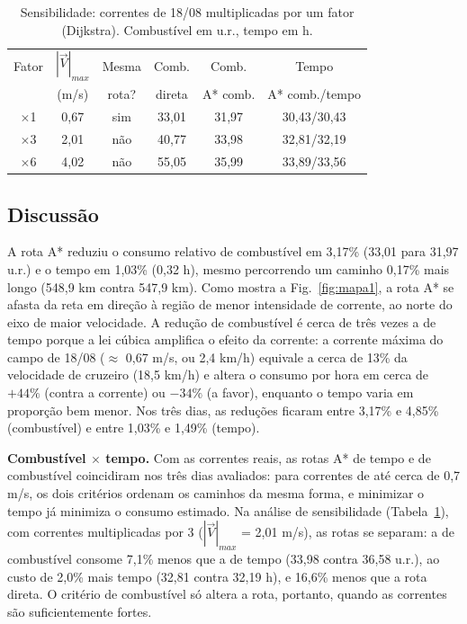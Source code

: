 \documentclass[conference]{IEEEtran}
\begin{document}
\begin{table}[t]
\caption{Sensibilidade: correntes de 18/08 multiplicadas por um fator (Dijkstra). Combustível em u.r., tempo em h.}
\label{tab:sens}
\centering
\footnotesize
\begin{tabular}{@{}cccccc@{}}
\toprule
Fator & $|\vec{V}|_{max}$ & Mesma & Comb. & Comb. & Tempo\\
 & (m/s) & rota? & direta & A* comb. & A* comb./tempo\\
\midrule
$\times$1 & 0,67 & sim & 33,01 & 31,97 & 30,43/30,43\\
$\times$3 & 2,01 & não & 40,77 & 33,98 & 32,81/32,19\\
$\times$6 & 4,02 & não & 55,05 & 35,99 & 33,89/33,56\\
\bottomrule
\end{tabular}
\end{table}

\subsection{Discussão}
A rota A* reduziu o consumo relativo de combustível em 3,17\% (33,01 para 31,97 u.r.) e o tempo em 1,03\% (0,32 h), mesmo percorrendo um caminho 0,17\% mais longo (548,9 km contra 547,9 km). Como mostra a Fig.~\ref{fig:mapa1}, a rota A* se afasta da reta em direção à região de menor intensidade de corrente, ao norte do eixo de maior velocidade. A redução de combustível é cerca de três vezes a de tempo porque a lei cúbica amplifica o efeito da corrente: a corrente máxima do campo de 18/08 ($\approx$ 0,67 m/s, ou 2,4 km/h) equivale a cerca de 13\% da velocidade de cruzeiro (18,5 km/h) e altera o consumo por hora em cerca de $+44\%$ (contra a corrente) ou $-34\%$ (a favor), enquanto o tempo varia em proporção bem menor. Nos três dias, as reduções ficaram entre 3,17\% e 4,85\% (combustível) e entre 1,03\% e 1,49\% (tempo).

\textbf{Combustível $\times$ tempo.} Com as correntes reais, as rotas A* de tempo e de combustível coincidiram nos três dias avaliados: para correntes de até cerca de 0,7 m/s, os dois critérios ordenam os caminhos da mesma forma, e minimizar o tempo já minimiza o consumo estimado. Na análise de sensibilidade (Tabela~\ref{tab:sens}), com correntes multiplicadas por 3 ($|\vec{V}|_{max}$ = 2,01 m/s), as rotas se separam: a de combustível consome 7,1\% menos que a de tempo (33,98 contra 36,58 u.r.), ao custo de 2,0\% mais tempo (32,81 contra 32,19 h), e 16,6\% menos que a rota direta. O critério de combustível só altera a rota, portanto, quando as correntes são suficientemente fortes.
\end{document}
